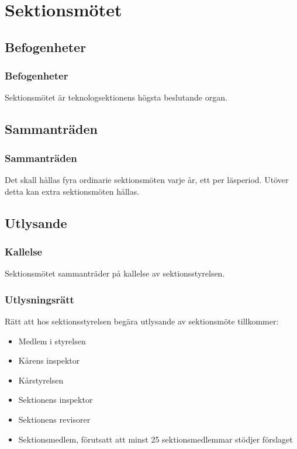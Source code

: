 \section{Sektionsmötet}

\subsection{Befogenheter}

\subsubsection{Befogenheter}
Sektionsmötet är teknologsektionens högsta beslutande organ.

\subsection{Sammanträden}

\subsubsection{Sammanträden}
Det skall hållas fyra ordinarie sektionsmöten varje år, ett per läsperiod. Utöver detta kan extra sektionsmöten hållas.

\subsection{Utlysande}
\label{sec:utlysande}

\subsubsection{Kallelse}
Sektionsmötet sammanträder på kallelse av sektionsstyrelsen.

\subsubsection{Utlysningsrätt}
Rätt att hos sektionsstyrelsen begära utlysande av sektionsmöte tillkommer:

\begin{itemize}
	\item Medlem i styrelsen
	\item Kårens inspektor
	\item Kårstyrelsen
	\item Sektionens inspektor
	\item Sektionens revisorer
	\item Sektionsmedlem, förutsatt att minst 25 sektionsmedlemmar stödjer förslaget
\end{itemize}

